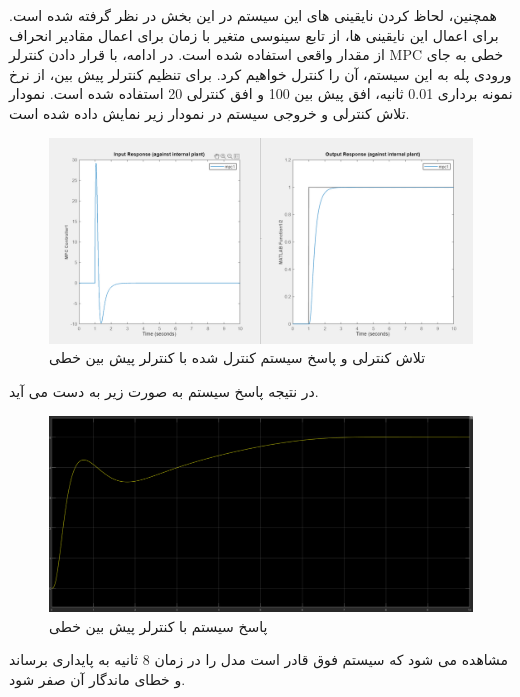 همچنین، لحاظ کردن نایقینی های این سیستم در این بخش در نظر گرفته شده است. برای اعمال این نایقینی ها، از تابع سینوسی متغیر با زمان برای اعمال مقادیر انحراف از مقدار واقعی استفاده شده است.
در ادامه، با قرار دادن کنترلر MPC خطی به جای ورودی پله به این سیستم، آن را کنترل خواهیم کرد. برای تنظیم کنترلر پیش بین، از نرخ نمونه برداری 0.01 ثانیه، افق پیش بین 100 و افق کنترلی 20 استفاده شده است.
نمودار تلاش کنترلی و خروجی سیستم در نمودار زیر نمایش داده شده است.
\begin{figure}[H]
	\centering
	\includegraphics[width=1\linewidth]{../img/Q1_linearMPC_response}
	\caption{تلاش کنترلی و پاسخ سیستم کنترل شده با کنترلر پیش بین خطی}
	\label{fig:q1linearmpcresponse}
\end{figure}
در نتیجه پاسخ سیستم به صورت زیر به دست می آید.
\begin{figure}[H]
	\centering
	\includegraphics[width=1\linewidth]{../img/Q1_linearMPC_RES}
	\caption{پاسخ سیستم با کنترلر پیش بین خطی}
	\label{fig:q1linearmpcres}
\end{figure}

مشاهده می شود که سیستم فوق قادر است مدل را در زمان 8 ثانیه به پایداری برساند و خطای ماندگار آن صفر شود.

